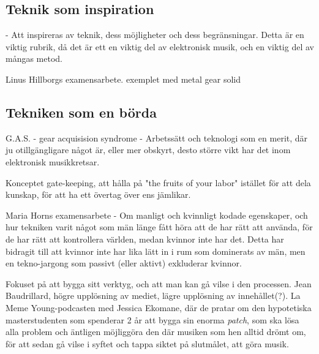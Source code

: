 \documentclass{article}
\begin{document}



\subsection{Teknik som inspiration}
- Att inspireras av teknik, dess möjligheter och dess begränsningar. Detta är en viktig rubrik, då det är ett
  en viktig del av elektronisk musik, och en viktig del av mångas metod. 

  Linus Hillborgs examensarbete. exemplet med metal gear solid

\subsection{Tekniken som en börda}
G.A.S. - gear acquisision syndrome
- Arbetssätt och teknologi som en merit, där ju otillgängligare något är, eller mer obskyrt, desto större vikt
  har det inom elektronisk musikkretsar. 

  Konceptet gate-keeping, att hålla på "the fruits of your labor" istället för att dela kunskap, för att ha
  ett övertag över ens jämlikar.

  Maria Horns examensarbete - Om manligt och kvinnligt kodade egenskaper, och hur tekniken varit något som män
  länge fått höra att de har rätt att använda, för de har rätt att kontrollera världen, medan kvinnor inte har
  det. Detta har bidragit till att kvinnor inte har lika lätt in i rum som dominerats av män, men en
  tekno-jargong som passivt (eller aktivt) exkluderar kvinnor. 

  Fokuset på att bygga sitt verktyg, och att man kan gå vilse i den processen. Jean Baudrillard, högre
  upplösning av mediet, lägre upplösning av innehållet(?). 
  La Meme Young-podcasten med Jessica Ekomane, där de pratar om den hypotetiska masterstudenten som spenderar
  2 år att bygga sin enorma \emph{patch}, som ska lösa alla problem och äntligen möjliggöra den där musiken
  som hen alltid drömt om, för att sedan gå vilse i syftet och tappa siktet på slutmålet, att göra musik. 
\end{document}
